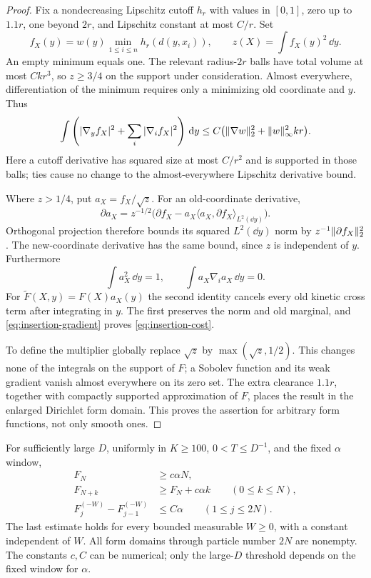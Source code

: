 \begin{proof}
Fix a nondecreasing Lipschitz cutoff $h_r$ with values in $[0,1]$,
zero up to $1.1r$, one beyond $2r$, and Lipschitz constant at most
$C/r$. Set
\[
 f_X(y)=w(y)\min_{1\le i\le n}h_r(d(y,x_i)),\qquad
 z(X)=\int f_X(y)^2\,\dd y.
\]
An empty minimum equals one. The relevant radius-$2r$ balls have
total volume at most $Ckr^3$, so $z\ge3/4$ on the support under
consideration. Almost everywhere, differentiation of the minimum
requires only a minimizing old coordinate and $y$. Thus
\begin{equation}\label{eq:insertion-gradient}
 \int\left(|\nabla_yf_X|^2+\sum_i|\nabla_if_X|^2\right)\,\mathrm d y
 \le C\bigl(\lVert\nabla w\rVert_2^2+\lVert w\rVert_\infty^2kr\bigr).
\end{equation}
Here a cutoff derivative has squared size at most $C/r^2$ and is
supported in those balls; ties cause no change to the almost-everywhere
Lipschitz derivative bound.

Where $z>1/4$, put $a_X=f_X/\sqrt z$. For an old-coordinate derivative,
\[
 \partial a_X=z^{-1/2}\bigl(\partial f_X-
             a_X\langle a_X,\partial f_X\rangle_{L^2(\dd y)}\bigr).
\]
Orthogonal projection therefore bounds its squared $L^2(\dd y)$
norm by $z^{-1}\lVert\partial f_X\rVert_2^2$. The new-coordinate
derivative has the same bound, since $z$ is independent of $y$.
Furthermore
\[
 \int a_X^2\,\dd y=1,\qquad
 \int a_X\nabla_i a_X\,\dd y=0.
\]
For $\widetilde F(X,y)=F(X)a_X(y)$ the second identity cancels
every old kinetic cross term after integrating in $y$. The first
preserves the norm and old marginal, and
\eqref{eq:insertion-gradient} proves \eqref{eq:insertion-cost}.

To define the multiplier globally replace $\sqrt z$ by
$\max(\sqrt z,1/2)$. This changes none of the integrals on the
support of $F$; a Sobolev function and its weak gradient vanish almost
everywhere on its zero set. The extra clearance $1.1r$, together with
compactly supported approximation of $F$, places the result in the
enlarged Dirichlet form domain. This proves the assertion for arbitrary
form functions, not only smooth ones.
\end{proof}

\begin{proposition}\label{prop:increments}
For sufficiently large $D$, uniformly in $K\ge100$,
$0<T\le D^{-1}$, and the fixed $\alpha$ window,
\begin{align}
 F_N&\ge c\alpha N,\label{eq:free-energy-lower}\\
 F_{N+k}&\ge F_N+c\alpha k \qquad(0\le k\le N),
                                      \label{eq:free-energy-increase}\\
 F_j^{(-W)}-F_{j-1}^{(-W)}&\le C\alpha
                    \qquad(1\le j\le2N).\label{eq:free-energy-insertion}
\end{align}
The last estimate holds for every bounded measurable $W\ge0$, with a
constant independent of $W$. All form domains through particle number
$2N$ are nonempty. The constants $c,C$ can be numerical; only the
large-$D$ threshold depends on the fixed window for $\alpha$.
\end{proposition}

